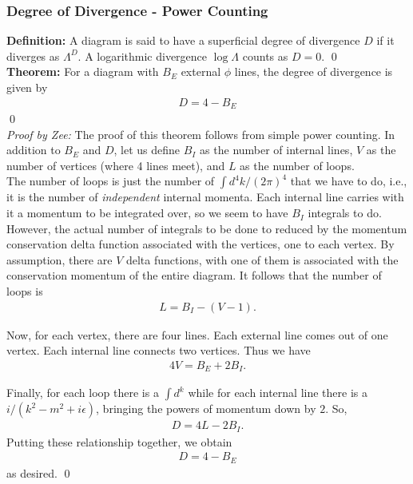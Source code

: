 \documentclass{book}
\theoremstyle{definition}
\begin{document}
\subsubsection{Degree of Divergence - Power Counting}




\noindent \textbf{Definition:} A diagram is said to have a superficial degree of divergence $D$ if it diverges as $\Lambda^D$. A logarithmic divergence $\log \Lambda$ counts as $D=0$. \qed \\

\noindent \textbf{Theorem:} For a diagram with $B_E$ external $\phi$ lines, the degree of divergence is given by
\begin{align}
\boxed{D = 4 - B_E}
\end{align}\qed \\


\noindent \textit{Proof by Zee:} The proof of this theorem follows from simple power counting. In addition to $B_E$ and $D$, let us define $B_I$ as the number of internal lines, $V$ as the number of vertices (where 4 lines meet), and $L$ as the number of loops. \\

The number of loops is just the number of $\int d^4k/(2\pi)^4$ that we have to do, i.e., it is the number of \textit{independent} internal momenta. Each internal line carries with it a momentum to be integrated over, so we seem to have $B_I$ integrals to do. However, the actual number of integrals to be done to reduced by the momentum conservation delta function associated with the vertices, one to each vertex. By assumption, there are $V$ delta functions, with one of them is associated with the conservation momentum of the entire diagram. It follows that the number of loops is
\begin{align}
L = B_I - (V - 1).
\end{align}


Now, for each vertex, there are four lines. Each external line comes out of one vertex. Each internal line connects two vertices. Thus we have
\begin{align}
4V = B_E + 2B_I.
\end{align}

Finally, for each loop there is a $\int d^k$ while for each internal line there is a $i/(k^2 -m^2 + i\epsilon)$, bringing the powers of momentum down by $2$. So,
\begin{align}
D = 4L - 2B_I.
\end{align}
Putting these relationship together, we obtain
\begin{align}
{D = 4- B_E}
\end{align}
as desired. \qed\\
\end{document}
